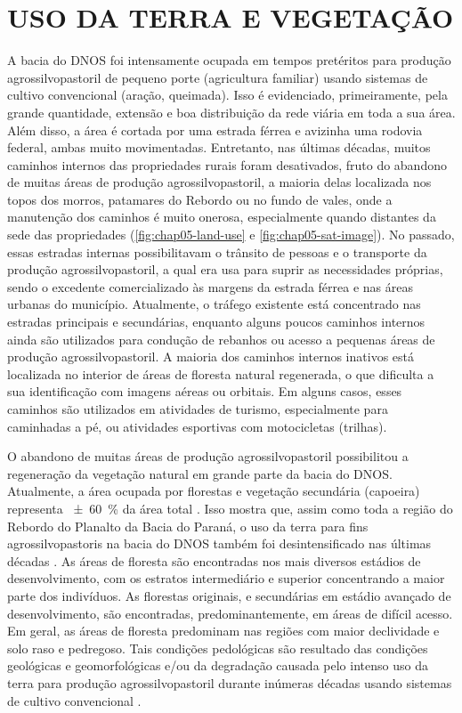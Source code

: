 \section{USO DA TERRA E VEGETAÇÃO}
\label{sec:chap03-landuse}

A bacia do DNOS foi intensamente ocupada em tempos pretéritos para produção agrossilvopastoril de pequeno 
porte (agricultura familiar) usando sistemas de cultivo convencional (aração, queimada). Isso é evidenciado, 
primeiramente, pela grande quantidade, extensão e boa distribuição da rede viária em toda a sua área. Além 
disso, a área é cortada por uma estrada férrea e avizinha uma rodovia federal, ambas muito movimentadas. 
Entretanto, nas últimas décadas, muitos caminhos internos das propriedades rurais foram desativados, fruto do 
abandono de muitas áreas de produção agrossilvopastoril, a maioria delas localizada nos topos dos morros, 
patamares do Rebordo ou no fundo de vales, onde a manutenção dos caminhos é muito onerosa, especialmente 
quando distantes da sede das propriedades (\autoref{fig:chap05-land-use} e \autoref{fig:chap05-sat-image}). No 
passado, essas estradas internas possibilitavam o trânsito de pessoas e o transporte da produção 
agrossilvopastoril, a qual era usa para suprir as necessidades próprias, sendo o excedente comercializado às 
margens da estrada férrea e nas áreas urbanas do município. Atualmente, o tráfego existente está concentrado 
nas estradas principais e secundárias, enquanto alguns poucos caminhos internos ainda são utilizados para 
condução de rebanhos ou acesso a pequenas áreas de produção agrossilvopastoril. A maioria dos caminhos internos 
inativos está localizada no interior de áreas de floresta natural regenerada, o que dificulta a sua 
identificação com imagens aéreas ou orbitais. Em alguns casos, esses caminhos são utilizados em atividades de 
turismo, especialmente para caminhadas a pé, ou atividades esportivas com motocicletas (trilhas).

O abandono de muitas áreas de produção agrossilvopastoril possibilitou a regeneração da vegetação natural em 
grande parte da bacia do DNOS. Atualmente, a área ocupada por florestas e vegetação secundária (capoeira) 
representa \SI{\pm60}{\percent} da área total \cite{SamuelRosaEtAl2011a}. Isso mostra que, assim como toda a 
região do Rebordo do Planalto da Bacia do Paraná, o uso da terra para fins agrossilvopastoris na bacia do DNOS 
também foi desintensificado nas últimas décadas \cite{SEMA/UFSM2001, DillEtAl2004, Poelking2007, Miguel2010, 
SamuelRosaEtAl2011a, Dullius2012, TenCatenEtAl2012}. As áreas de floresta são encontradas nos mais diversos 
estádios de desenvolvimento, com os estratos intermediário e superior concentrando a maior parte dos 
indivíduos. As florestas originais, e secundárias em estádio avançado de desenvolvimento, são encontradas, 
predominantemente, em áreas de difícil acesso. Em geral, as áreas de floresta predominam nas regiões com maior 
declividade e solo raso e pedregoso. Tais condições pedológicas são resultado das condições geológicas e 
geomorfológicas e/ou da degradação causada pelo intenso uso da terra para produção agrossilvopastoril durante 
inúmeras décadas usando sistemas de cultivo convencional \cite{SamuelRosaEtAl2011a}.

